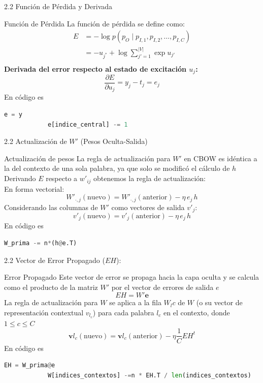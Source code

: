 \documentclass{beamer}
\begin{document}
\begin{frame}[fragile]{2.2 Función de Pérdida y Derivada}
	\begin{block}{Función de Pérdida}
		La función de pérdida se define como:
\[
\begin{aligned}
	E &= - \log p(p_O \mid p_{I,1}, p_{I,2}, \dots, p_{I,C}) \\
	&= - u_{j^*} + \log \sum_{j'=1}^{|V|} \exp u_{j'} \\
\end{aligned}
\]
		\textbf{Derivada del error respecto al estado de excitación $u_j$:}
		\[
		\frac{\partial E}{\partial u_j} = y_j - t_j = e_j
		\]
			En código es
		\begin{lstlisting}[language=Python]
			e = y
			e[indice_central] -= 1
		\end{lstlisting}

	\end{block}
\end{frame}
	
\begin{frame}[fragile]{2.2 Actualización de $W'$ (Pesos Oculta-Salida)}
	\begin{block}{Actualización de pesos}
	La regla de actualización para $W'$ en CBOW es idéntica a la del contexto de una sola palabra, ya que solo se modificó el cálculo de $h$\\
	Derivando $E$ respecto a $w'_{ij}$ obtenemos la regla de actualización:\\
	En forma vectorial:
	\[
	W'_{\cdot,j}(\text{nuevo}) = W'_{\cdot,j}(\text{anterior}) - \eta \, e_j \, h
	\]
	Considerando las columnas de $W'$ como vectores de salida $v'_j$:
	\[
	v'_j(\text{nuevo}) = v'_j(\text{anterior}) - \eta \, e_j \, h
	\]
	En código es
	\begin{lstlisting}[language=Python]
		W_prima -= n*(h@e.T)
	\end{lstlisting}
	
	
	
	\end{block}
\end{frame}



\begin{frame}[fragile]{2.2 Vector de Error Propagado ($EH$):}
	\begin{block}{Error Propagado}
		Este vector de error se propaga hacia la capa oculta y se calcula como el producto de la matriz $W'$ por el vector de errores de salida $e$\\
		\[
		EH = W' \mathbf{e}
		\]
		La regla de actualización para $W$ se aplica a la fila $W_lc$ de $W$ (o su vector de representación contextual $v_{l_c}$) para cada palabra $l_c$ en el contexto, donde $1 \leq c \leq C$
		\[
		\mathbf{v}{l_c}(\text{nuevo}) = \mathbf{v}{l_c}(\text{anterior}) - \eta \frac{1}{C} EH^t
		\]
		En código es
		\begin{lstlisting}[language=Python]
			EH = W_prima@e
			W[indices_contextos] -=n * EH.T / len(indices_contextos)
		\end{lstlisting}
	\end{block}
\end{frame}
\end{document}

